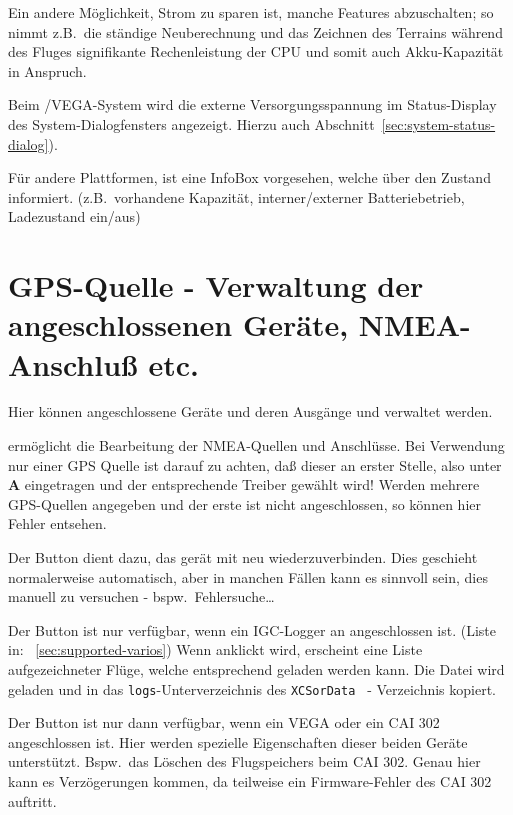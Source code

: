 Ein andere Möglichkeit, Strom zu sparen ist, manche Features abzuschalten; so nimmt z.B.\ die ständige Neuberechnung und das Zeichnen des Terrains während des Fluges signifikante Rechenleistung der CPU und somit auch Akku-Kapazität in Anspruch.

Beim \al/VEGA-System wird die externe Versorgungsspannung im Status-Display des System-Dialogfensters angezeigt.  Hierzu auch Abschnitt~\ref{sec:system-status-dialog}).

Für andere Plattformen, ist eine  InfoBox vorgesehen, welche über den Zustand informiert.
(z.B.\ vorhandene Kapazität, interner/externer Batteriebetrieb, Ladezustand ein/aus)
\section{GPS-Quelle - Verwaltung der angeschlossenen Geräte, NMEA-Anschluß etc.}

Hier können angeschlossene Geräte und deren Ausgänge und verwaltet werden.

 ermöglicht die Bearbeitung der NMEA-Quellen und Anschlüsse.
 Bei Verwendung nur einer GPS Quelle ist darauf zu achten, daß dieser an erster Stelle, also unter \textbf{A} eingetragen und der entsprechende Treiber gewählt wird!  Werden mehrere GPS-Quellen angegeben und der erste ist nicht angeschlossen, so können hier Fehler entsehen.


Der Button  dient dazu, das gerät mit \xc neu 
wiederzuverbinden. Dies geschieht normalerweise automatisch, aber in manchen Fällen kann es sinnvoll sein, dies  
manuell zu versuchen - bspw.\ Fehlersuche\dots

Der Button  ist nur verfügbar, wenn ein IGC-Logger an \xc angeschlossen ist. (Liste in: ~\ref{sec:supported-varios}) 
Wenn anklickt wird, erscheint eine Liste aufgezeichneter Flüge, welche entsprechend geladen werden kann. Die Datei wird geladen und in das \texttt{logs}-Unterverzeichnis des \texttt{XCSorData } - Verzeichnis kopiert.

Der Button  ist nur dann verfügbar, wenn ein VEGA oder ein CAI 302 angeschlossen ist. Hier werden spezielle Eigenschaften dieser beiden Geräte unterstützt. Bspw.\ das Löschen des Flugspeichers beim CAI 302. \warning Genau hier kann es Verzögerungen kommen, da teilweise ein Firmware-Fehler des CAI 302 auftritt.

